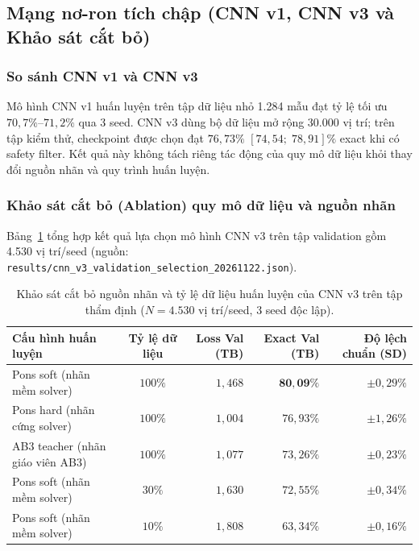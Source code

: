 \documentclass[11pt, a4paper]{article}
\begin{document}
\subsection{Mạng nơ-ron tích chập (CNN v1, CNN v3 và Khảo sát cắt bỏ)}
\subsubsection{So sánh CNN v1 và CNN v3}
Mô hình CNN v1 huấn luyện trên tập dữ liệu nhỏ 1.284 mẫu đạt tỷ lệ tối ưu $70{,}7\%\text{--}71{,}2\%$ qua 3 seed. CNN v3 dùng bộ dữ liệu mở rộng 30.000 vị trí; trên tập kiểm thử, checkpoint được chọn đạt $76{,}73\%$ $[74{,}54;\; 78{,}91]\%$ exact khi có safety filter. Kết quả này không tách riêng tác động của quy mô dữ liệu khỏi thay đổi nguồn nhãn và quy trình huấn luyện.

\subsubsection{Khảo sát cắt bỏ (Ablation) quy mô dữ liệu và nguồn nhãn}
Bảng~\ref{tab:cnn_v2_ablation} tổng hợp kết quả lựa chọn mô hình CNN v3 trên tập validation gồm 4.530 vị trí/seed (nguồn: \texttt{results/cnn\_v3\_validation\_selection\_20261122.json}).

\begin{table}[H]
    \centering
    \caption{Khảo sát cắt bỏ nguồn nhãn và tỷ lệ dữ liệu huấn luyện của CNN v3 trên tập thẩm định ($N = 4.530$ vị trí/seed, 3 seed độc lập).}
    \label{tab:cnn_v2_ablation}
    \begin{tabular}{@{} l c r r r @{}}
        \toprule
        \textbf{Cấu hình huấn luyện} & \textbf{Tỷ lệ dữ liệu} & \textbf{Loss Val (TB)} & \textbf{Exact Val (TB)} & \textbf{Độ lệch chuẩn (SD)} \\
        \midrule
        Pons soft (nhãn mềm solver) & $100\%$ & $1{,}468$ & $\mathbf{80{,}09\%}$ & $\pm 0{,}29\%$ \\
        Pons hard (nhãn cứng solver) & $100\%$ & $1{,}004$ & $76{,}93\%$ & $\pm 1{,}26\%$ \\
        AB3 teacher (nhãn giáo viên AB3) & $100\%$ & $1{,}077$ & $73{,}26\%$ & $\pm 0{,}23\%$ \\
        Pons soft (nhãn mềm solver) & $30\%$ & $1{,}630$ & $72{,}55\%$ & $\pm 0{,}34\%$ \\
        Pons soft (nhãn mềm solver) & $10\%$ & $1{,}808$ & $63{,}34\%$ & $\pm 0{,}16\%$ \\
        \bottomrule
    \end{tabular}
\end{table}
\end{document}
